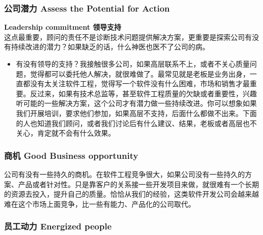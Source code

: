 \hypertarget{ux516cux53f8ux6f5cux529b-assess-the-potential-for-action}{%
\subsubsection{公司潜力 Assess the Potential for
Action}\label{ux516cux53f8ux6f5cux529b-assess-the-potential-for-action}}

\textbf{Leadership commitment 领导支持}\\
这点最重要，顾问的责任不是诊断技术问题提供解决方案，更重要是探索公司有没有持续改进的潜力？如果缺乏的话，什么神医也医不了公司的病。

\begin{itemize}
\tightlist
\item
  有没有领导的支持？我接触很多公司，如果高层联系不上，或者不关心质量问题，觉得都可以委托他人解决，就很难做了。最常见就是老板是业务出身，一直都没有太关注软件工程，觉得写一个软件没有什么困难，市场和销售才最重要。反过来，如果有技术总监等，甚至软件工程质量的欠缺或者重要性，兴趣听可能的一些解决方案，这个公司才有潜力做一些持续改进。你可以想象如果我们开展培训，要求他们参加，如果高层不支持，后面什么都做不出来。下面的人也知道我们顾问，或者我们讨论后有什么建议、结果，老板或者高层也不关心，肯定就不会有什么效果。
\end{itemize}

\hypertarget{ux5546ux673a-good-business-opportunity}{%
\subsubsection{商机 Good Business
opportunity}\label{ux5546ux673a-good-business-opportunity}}

公司有没有一些持久的商机。在软件工程竞争很大，如果公司没有一些持久的方案、产品或者针对性。只是靠客户的关系接一些开发项目来做，就很难有一个长期的资源去投入，提升自己的质量。恰恰从我们的经验，这类软件开发公司会越来越难在这个市场上面竞争，比一些有能力、产品化的公司取代。

\hypertarget{ux5458ux5de5ux52a8ux529b-energized-people}{%
\subsubsection{员工动力 Energized
people}\label{ux5458ux5de5ux52a8ux529b-energized-people}}


